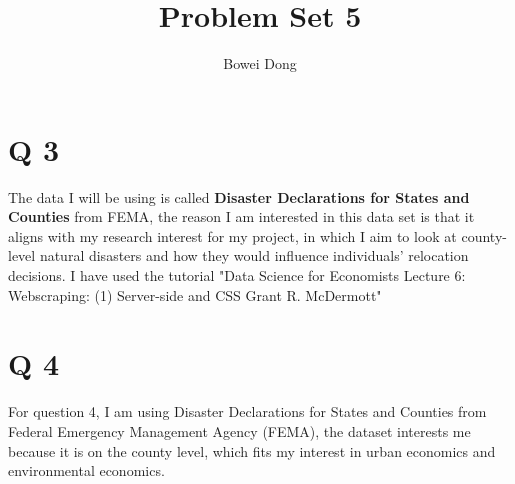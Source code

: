 \documentclass{article}
\title{Problem Set 5}
\author{Bowei Dong}
\date{}
\begin{document}
\maketitle
\section*{Q 3}
The data I will be using is called \textbf{Disaster Declarations for States and Counties} from FEMA, the reason I am interested in this data set is that it aligns with my research interest for my project, in which I aim to look at county-level natural disasters and how they would influence individuals' relocation decisions. I have used the tutorial "Data Science for Economists
Lecture 6: Webscraping: (1) Server-side and CSS
Grant R. McDermott"

\section*{Q 4}
For question 4, I am using Disaster Declarations for States and Counties from Federal Emergency Management Agency (FEMA), the dataset interests me because it is on the county level, which fits my interest in urban economics and environmental economics.
\end{document}
